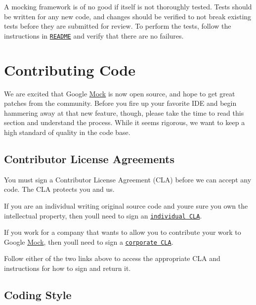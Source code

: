 A mocking framework is of no good if itself is not thoroughly tested. Tests should be written for any new code, and changes should be verified to not break existing tests before they are submitted for review. To perform the tests, follow the instructions in \href{http://code.google.com/p/googlemock/source/browse/trunk/README}{\tt R\+E\+A\+D\+ME} and verify that there are no failures.

\section*{Contributing Code}

We are excited that Google \hyperlink{classMock}{Mock} is now open source, and hope to get great patches from the community. Before you fire up your favorite I\+DE and begin hammering away at that new feature, though, please take the time to read this section and understand the process. While it seems rigorous, we want to keep a high standard of quality in the code base.

\subsection*{Contributor License Agreements}

You must sign a Contributor License Agreement (C\+LA) before we can accept any code. The C\+LA protects you and us.


\begin{DoxyItemize}
\item If you are an individual writing original source code and you\textquotesingle{}re sure you own the intellectual property, then you\textquotesingle{}ll need to sign an \href{http://code.google.com/legal/individual-cla-v1.0.html}{\tt individual C\+LA}.
\item If you work for a company that wants to allow you to contribute your work to Google \hyperlink{classMock}{Mock}, then you\textquotesingle{}ll need to sign a \href{http://code.google.com/legal/corporate-cla-v1.0.html}{\tt corporate C\+LA}.
\end{DoxyItemize}

Follow either of the two links above to access the appropriate C\+LA and instructions for how to sign and return it.

\subsection*{Coding Style}


